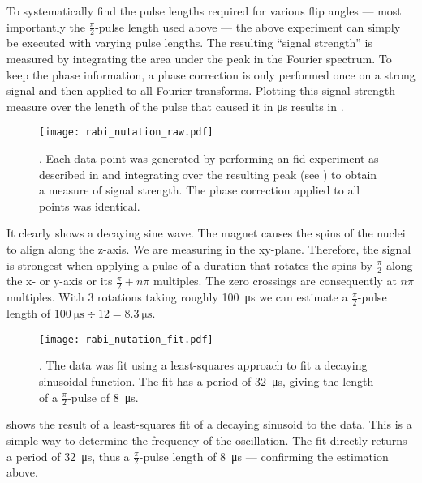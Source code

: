 To systematically find the pulse lengths required for various flip angles --- most importantly the \(\frac{\pi}{2}\)-pulse length used above --- the above experiment can simply be executed with varying pulse lengths. The resulting \enquote{signal strength} is measured by integrating the area under the peak in the Fourier spectrum. To keep the phase information, a phase correction is only performed once on a strong signal and then applied to all Fourier transforms. Plotting this signal strength measure over the length of the pulse that caused it in \unit{\micro\second} results in .

\begin{figure}[h!bt]
    \centering
    \texttt{[image: rabi\_nutation\_raw.pdf]}
    \caption{. Each data point was generated by performing an \acrshort{fid} experiment as described in  and integrating over the resulting peak (see ) to obtain a measure of signal strength. The phase correction applied to all points was identical.}
\end{figure}

It clearly shows a decaying sine wave. The magnet causes the spins of the nuclei to align along the z-axis. We are measuring in the xy-plane. Therefore, the signal is strongest when applying a pulse of a duration that rotates the spins by \(\frac{\pi}{2}\) along the x- or y-axis or its \(\frac{\pi}{2} + n\pi{}\) multiples. The zero crossings are consequently at \(n\pi{}\) multiples. With 3 rotations taking roughly \qty{100}{\micro\second} we can estimate a \(\frac{\pi}{2}\)-pulse length of \(\qty{100}{\micro\second}\div 12 = \qty{8.3}{\micro\second}\).

\begin{figure}[h!bt]
    \centering
    \texttt{[image: rabi\_nutation\_fit.pdf]}
    \caption{. The data was fit using a least-squares approach to fit a decaying sinusoidal function. The fit has a period of \qty{32}{\micro\second}, giving the length of a $\frac{\pi}{2}$-pulse of \qty{8}{\micro\second}.}
\end{figure}

 shows the result of a least-squares fit of a decaying sinusoid to the data. This is a simple way to determine the frequency of the oscillation. The fit directly returns a period of \qty{32}{\micro\second}, thus a \(\frac{\pi}{2}\)-pulse length of \qty{8}{\micro\second} --- confirming the estimation above.

